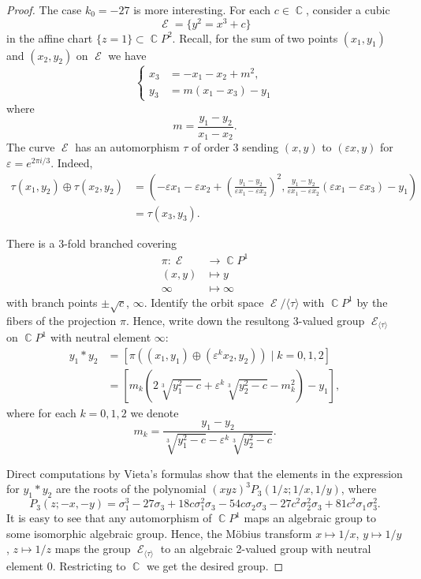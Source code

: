 \documentclass[14pt, dvipsnames]{extarticle}
\theoremstyle{definition}
\theoremstyle{definition}
\theoremstyle{remark}
\DeclareMathOperator{\Cc}{\mathbb{C}}
\DeclareMathOperator{\E}{\mathcal{E}}
\renewcommand{\epsilon}{\varepsilon}
\begin{document}
\begin{proof}
The case $k_0 = -27$ is more interesting. For each $c\in\Cc$, consider a cubic $$\E = \{y^2 = x^3 + c\}$$ in the affine chart $\{z = 1\}\subset\Cc\!P^2$. Recall, for the sum of two points $(x_1, y_1)$ and $(x_2, y_2)$ on $\E$ we have \begin{equation}\label{sum_formula}\left\{\begin{aligned} x_3 &= -x_1 - x_2 + m^2,\nonumber\\ y_3 &= m(x_1 - x_3) - y_1\end{aligned}\right.\end{equation} where $$m = \frac{y_1 - y_2}{x_1 - x_2}.$$ The curve $\E$ has an automorphism $\tau$ of order 3 sending $(x, y)$ to $(\epsilon x, y)$ for $\epsilon = e^{2\pi i/3}$. Indeed, $$\begin{aligned}\tau(x_1, y_2)\oplus \tau(x_2, y_2) &= \left(- \epsilon x_1 - \epsilon x_2 + \left(\frac{y_1 - y_2}{\epsilon x_1 - \epsilon x_2}\right)^2, \frac{y_1 - y_2}{\epsilon x_1-\epsilon x_2}(\epsilon x_1 - \epsilon x_3) - y_1 \right)\\ &= \tau(x_3, y_3).\end{aligned}$$

 There is a 3-fold branched covering $$\begin{aligned}\pi: \E&\to \Cc\!P^1\\ (x, y)&\mapsto y\\\infty&\mapsto\infty\end{aligned}$$ with branch points $\pm\sqrt{c}$, $\infty$. Identify the orbit space $\E/\langle \tau \rangle$ with $\Cc\!P^1$ by the fibers of the projection $\pi$. Hence, write down the resultong 3-valued group $\E_{\langle \tau \rangle}$ on $\Cc\!P^1$ with neutral element $\infty$: $$\begin{aligned}y_1\ast y_2 &= [\pi((x_1, y_1)\oplus(\epsilon^k x_2, y_2))\mid k = 0, 1, 2]\\ &= \left[ m_k\left(2\sqrt[3]{y_1^2 - c} + \epsilon^k\sqrt[3]{y_2^2 - c} - m_k^2\right) - y_1 \right],\end{aligned}$$ where for each $k = 0, 1, 2$ we denote $$m_k = \frac{y_1 - y_2}{\sqrt[3]{y_1^2 - c} - \epsilon^k\sqrt[3]{y_2^2 -c}}.$$

Direct computations by Vieta's formulas show that the elements in the expression for $y_1\ast y_2$ are the roots of the polynomial $(xyz)^3P_{3}(1/z; 1/x, 1/y)$, where $$P_{3}(z; -x, -y) = \sigma_1^3 - 27 \sigma_3 + 18 c \sigma_1^2 \sigma_3 - 54 c \sigma_2 \sigma_3 - 27 c^2 \sigma_2^2 \sigma_3 + 81 c^2 \sigma_1 \sigma_3^2.$$ It is easy to see that any automorphism of $\Cc\!P^1$ maps an algebraic group to some isomorphic algebraic group. Hence, the Möbius transform $x\mapsto 1/x$, $y\mapsto 1/y$, $z\mapsto 1/z$ maps the group $\E_{\langle \tau \rangle}$ to an algebraic 2-valued group with neutral element 0. Restricting to $\Cc$ we get the desired group.

\end{proof}
\end{document}

